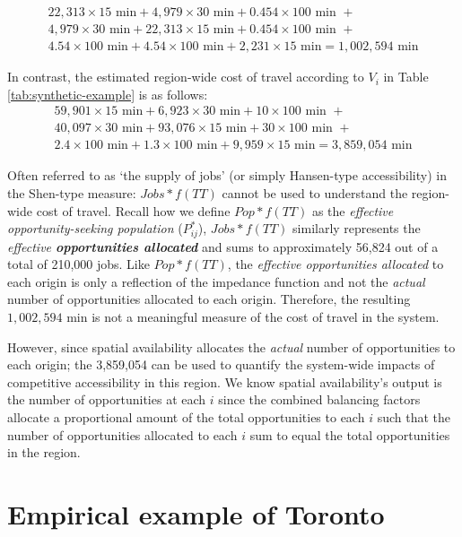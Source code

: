 \documentclass[10pt,letterpaper]{article}
\begin{document}
\[
\begin{array}{l}
22,313\times 15 \text{ min} + 4,979\times 30 \text{ min} + 0.454\times 100 \text{ min } + \\
4,979\times 30 \text{ min} + 22,313\times 15 \text{ min} + 0.454\times 100 \text{ min } + \\
4.54\times 100 \text{ min} + 4.54\times 100 \text{ min} + 2,231\times 15 \text{ min} = 1,002,594\text{ min}
\end{array}
\]

In contrast, the estimated region-wide cost of travel according to
\(V_i\) in Table \ref{tab:synthetic-example} is as follows: \[
\begin{array}{l}
59,901\times 15 \text{ min} + 6,923\times 30 \text{ min} + 10\times 100 \text{ min } +\\
40,097\times 30 \text{ min} + 93,076\times 15 \text{ min} + 30\times 100 \text{ min } +\\
2.4\times 100 \text{ min} + 1.3\times 100 \text{ min} + 9,959\times 15 \text{ min} = 3,859,054\text{ min}
\end{array}
\]

Often referred to as `the supply of jobs' (or simply Hansen-type
accessibility) in the Shen-type measure: \(Jobs*f(TT)\) cannot be used
to understand the region-wide cost of travel. Recall how we define
\(Pop*f(TT)\) as the \emph{effective opportunity-seeking population}
(\(P^*_{ij}\)), \(Jobs*f(TT)\) similarly represents the \emph{effective
\textbf{opportunities allocated}} and sums to approximately 56,824 out
of a total of 210,000 jobs. Like \(Pop*f(TT)\), the \emph{effective
opportunities allocated} to each origin is only a reflection of the
impedance function and not the \emph{actual} number of opportunities
allocated to each origin. Therefore, the resulting
\(1,002,594\text{ min}\) is not a meaningful measure of the cost of
travel in the system.

However, since spatial availability allocates the \emph{actual} number
of opportunities to each origin; the 3,859,054 can be used to
quantify the system-wide impacts of competitive accessibility in this
region. We know spatial availability's output is the number of
opportunities at each \(i\) since the combined balancing factors
allocate a proportional amount of the total opportunities to each \(i\)
such that the number of opportunities allocated to each \(i\) sum to
equal the total opportunities in the region.

\hypertarget{empirical-example-of-toronto}{%
\section{Empirical example of
Toronto}\label{empirical-example-of-toronto}}
\end{document}
